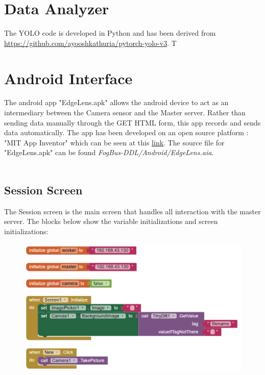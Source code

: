 \documentclass{article}
\begin{document}
\newpage

\section{Data Analyzer}
The YOLO code is developed in Python and has been derived from \url{https://github.com/ayooshkathuria/pytorch-yolo-v3}. T
\newpage

\section{Android Interface}

The android app "EdgeLens.apk" allows the android device to act as an intermediary between the Camera sensor and the Master server. Rather than sending data manually through the GET HTML form, this app records and sends data automatically. The app has been developed on an open source platform : "MIT App Inventor" which can be seen at this \href{http://appinventor.mit.edu/explore/}{link}. The source file for "EdgeLens.apk" can be found \textit{FogBus-DDL/Android/EdgeLens.aia}. \\ \\


\subsection{Session Screen}
The Session screen is the main screen that handles all interaction with the master server. The blocks below show the variable initializations and screen initializations:
\begin{figure}[h]
\centering %
\includegraphics[width=\textwidth]{1.PNG}
\end{figure}
\end{document}
